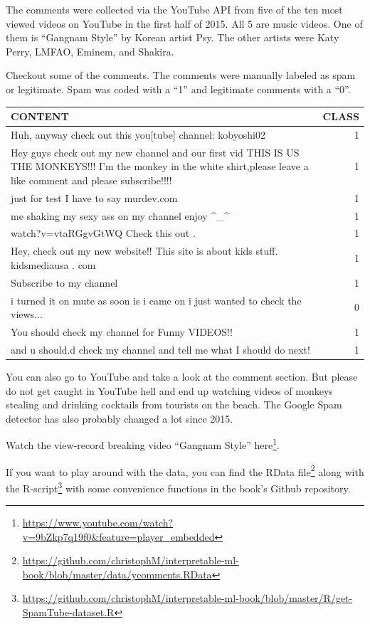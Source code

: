 \documentclass[
  12pt,
]{krantz}
\renewcommand{\href}[2]{#2\footnote{\url{#1}}}
\begin{document}
The comments were collected via the YouTube API from five of the ten most viewed videos on YouTube in the first half of 2015.
All 5 are music videos.
One of them is ``Gangnam Style'' by Korean artist Psy.
The other artists were Katy Perry, LMFAO, Eminem, and Shakira.

Checkout some of the comments.
The comments were manually labeled as spam or legitimate.
Spam was coded with a ``1'' and legitimate comments with a ``0''.

\begin{tabular}{>{\raggedright\arraybackslash}p{10cm}|r}
\hline
CONTENT & CLASS\\
\hline
Huh, anyway check out this you[tube] channel: kobyoshi02 & 1\\
\hline
Hey guys check out my new channel and our first vid THIS IS US THE  MONKEYS!!! I'm the monkey in the white shirt,please leave a like comment  and please subscribe!!!! & 1\\
\hline
just for test I have to say murdev.com & 1\\
\hline
me shaking my sexy ass on my channel enjoy \textasciicircum{}\_\textasciicircum{} & 1\\
\hline
watch?v=vtaRGgvGtWQ   Check this out . & 1\\
\hline
Hey, check out my new website!! This site is about kids stuff. kidsmediausa  . com & 1\\
\hline
Subscribe to my channel & 1\\
\hline
i turned it on mute as soon is i came on i just wanted to check the  views... & 0\\
\hline
You should check my channel for Funny VIDEOS!! & 1\\
\hline
and u should.d check my channel and tell me what I should do next! & 1\\
\hline
\end{tabular}

You can also go to YouTube and take a look at the comment section.
But please do not get caught in YouTube hell and end up watching videos of monkeys stealing and drinking cocktails from tourists on the beach.
The Google Spam detector has also probably changed a lot since 2015.

\href{https://www.youtube.com/watch?v=9bZkp7q19f0\&feature=player_embedded}{Watch the view-record breaking video ``Gangnam Style'' here}.

If you want to play around with the data, you can find the \href{https://github.com/christophM/interpretable-ml-book/blob/master/data/ycomments.RData}{RData file} along with the \href{https://github.com/christophM/interpretable-ml-book/blob/master/R/get-SpamTube-dataset.R}{R-script} with some convenience functions in the book's Github repository.
\end{document}
